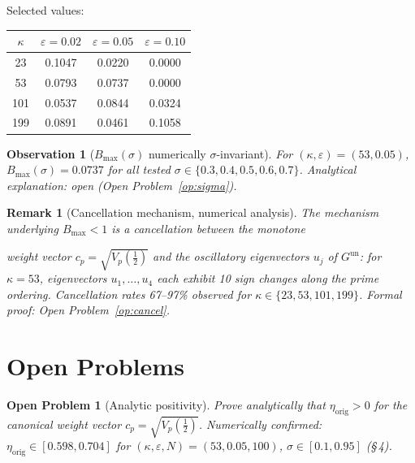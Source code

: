 \documentclass[11pt]{article}
\newtheorem{observation}[theorem]{Observation}
\newtheorem*{remark}{Remark}
\newtheorem{openproblem}[theorem]{Open Problem}
\newcommand{\etaorig}{\eta_{\mathrm{orig}}}
\newcommand{\Gun}{G^{\mathrm{un}}}
\begin{document}
Selected values:

\begin{center}
\begin{tabular}{cccc}
\toprule
$\kappa$ & $\varepsilon=0.02$ & $\varepsilon=0.05$ & $\varepsilon=0.10$ \\
\midrule
23  & 0.1047 & 0.0220 & 0.0000 \\
53  & 0.0793 & 0.0737 & 0.0000 \\
101 & 0.0537 & 0.0844 & 0.0324 \\
199 & 0.0891 & 0.0461 & 0.1058 \\
\bottomrule
\end{tabular}
\end{center}

\begin{observation}[$B_{\max}(\sigma)$ numerically $\sigma$-invariant]
For $(\kappa,\varepsilon)=(53,0.05)$, $B_{\max}(\sigma)=0.0737$ for all
tested $\sigma\in\{0.3,0.4,0.5,0.6,0.7\}$. Analytical explanation: open
(Open Problem~\ref{op:sigma}).
\end{observation}

\begin{remark}[Cancellation mechanism, numerical analysis]
The mechanism underlying $B_{\max}<1$ is a cancellation between the monotone

weight vector $c_p=\sqrt{V_p({\textstyle\frac12})}$ and the oscillatory eigenvectors $u_j$
of $\Gun$: for $\kappa=53$, eigenvectors $u_1,\ldots,u_4$ each exhibit 10
sign changes along the prime ordering. Cancellation rates 67--97\% observed
for $\kappa\in\{23,53,101,199\}$. Formal proof: Open Problem~\ref{op:cancel}.
\end{remark}

\section{Open Problems}


\begin{openproblem}[Analytic positivity]\label{op:pos}
Prove analytically that $\etaorig>0$ for the canonical weight vector
$c_p=\sqrt{V_p({\textstyle\frac12})}$.
Numerically confirmed: $\etaorig\in[0.598,0.704]$ for $(\kappa,\varepsilon,N)=(53,0.05,100)$,
$\sigma\in[0.1,0.95]$ (\S\,4).
\end{openproblem}
\end{document}
